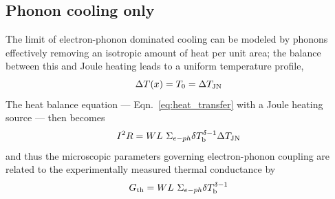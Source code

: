\subsection{Phonon cooling only}
The limit of electron-phonon dominated cooling can be modeled by phonons effectively removing an isotropic amount of heat per unit area; the balance between this and Joule heating leads to a uniform temperature profile, 
\begin{equation}
\Delta T(x) = T_0 = \Delta T_{\mathrm{JN}}
\end{equation}
The heat balance equation --- Eqn.~\ref{eq:heat_transfer} with a Joule heating source --- then becomes
\begin{equation}
I^2R = WL~\Sigma_{e-ph}\mathrm{\delta} T_\mathrm{b}^{\mathrm{\delta}-1}\Delta T_{\mathrm{JN}}
\end{equation}
and thus the microscopic parameters governing electron-phonon coupling are related to the experimentally measured thermal conductance by
\begin{equation}
G_{\mathrm{th}} = WL~\Sigma_{e-ph}\mathrm{\delta} T_\mathrm{b}^{\mathrm{\delta}-1}
\end{equation}

